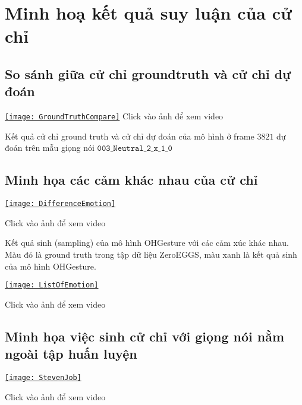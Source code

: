 \chapter{Minh hoạ kết quả suy luận của cử chỉ}
\label{Appendix3}

\section{So sánh giữa cử chỉ groundtruth và cử chỉ dự đoán}


\begin{center}
\centering
\href{https://youtu.be/22lNm2tvmrk}{%
\texttt{[image: GroundTruthCompare]}}
{\tiny Click vào ảnh để xem video}
\end{center}

Kết quả cử chỉ ground truth và cử chỉ dự đoán của mô hình ở frame $3821$ dự đoán trên mẫu giọng nói $\texttt{003\_Neutral\_2\_x\_1\_0}$

\section{Minh họa các cảm khác nhau của cử chỉ}

{
	\begin{center}
		\centering
		\href{https://youtu.be/KUlBZXLtYJ4}{%
			\texttt{[image: DifferenceEmotion]}}
		
		{\tiny Click vào ảnh để xem video}
	\end{center}
}

Kết quả sinh (sampling) của mô hình OHGesture với các cảm xúc khác nhau. Màu đỏ là ground truth trong tập dữ liệu ZeroEGGS, màu xanh là kết quả sinh của mô hình OHGesture.

{
	\begin{center}
		\centering
		\href{https://youtu.be/eZghfNGmZn8}{%
			\texttt{[image: ListOfEmotion]}}
		
		{\tiny Click vào ảnh để xem video}
	\end{center}
}

\section{Minh họa việc sinh cử chỉ với giọng nói nằm ngoài tập huấn luyện}

{
	\begin{center}
		\centering
		\href{https://www.youtube.com/watch?v=B6nv1kQmi-Q}{%
		\texttt{[image: StevenJob]}}
		
		{\tiny Click vào ảnh để xem video}
	\end{center}
}

